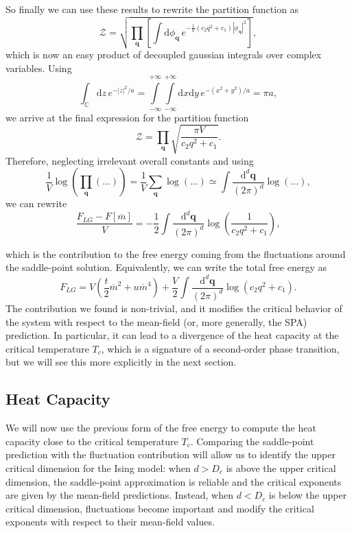 So finally we can use these results to rewrite the partition function as
\[
    \mathcal{Z} = \sqrt{\prod_{\mathbf{q}} \left[ \int \mathrm{d}\phi_{\mathbf{q}} \, e^{- \frac{1}{V} (c_2 q^2 + c_1) |\phi_{\mathbf{q}}|^2} \right]},
\]
which is now an easy product of decoupled gaussian integrals over complex variables. Using
\[
    \int_{\mathbb{C}} \mathrm{d}z \, e^{-|z|^2 / a} = \int\limits_{-\infty}^{+\infty} \int\limits_{-\infty}^{+\infty} \mathrm{d}x \mathrm{d}y \, e^{-(x^2 + y^2) / a} = \pi a,
\]
we arrive at the final expression for the partition function
\[
    \mathcal{Z} = \prod_{\mathbf{q}} \sqrt{\frac{\pi V}{c_2 q^2 + c_1}}.
\]
Therefore, neglecting irrelevant overall constants and using
\[
    \frac{1}{V} \log \left( \prod_{\mathbf{q}} (\dots) \right) = \frac{1}{V} \sum_{\mathbf{q}} \log(\dots) \simeq \int \frac{\mathrm{d}^d \mathbf{q}}{(2\pi)^d} \log(\dots),
\]
we can rewrite
\[
    \boxed{ \frac{F_{LG} - F[\overline{m}]}{V} = - \frac{1}{2} \int \frac{\mathrm{d}^d \mathbf{q}}{(2\pi)^d} \log \left( \frac{1}{c_2 q^2 + c_1} \right) },
\]

which is the contribution to the free energy coming from the fluctuations around the saddle-point solution. Equivalently, we can write the total free energy as
\[
    F_{LG} = V \left( \frac{t}{2}\overline{m}^2 + u\overline{m}^4 \right) + \frac{V}{2} \int \frac{\mathrm{d}^d \mathbf{q}}{(2\pi)^d} \log(c_2 q^2 + c_1).
\]
The contribution we found is non-trivial, and it modifies the critical behavior of the system with respect to the mean-field (or, more generally, the SPA) prediction. In particular, it can lead to a divergence of the heat capacity at the critical temperature \( T_c \), which is a signature of a second-order phase transition, but we will see this more explicitly in the next section.

\subsection{Heat Capacity}

We will now use the previous form of the free energy to compute the heat capacity close to the critical temperature \( T_c \). Comparing the saddle-point prediction with the fluctuation contribution will allow us to identify the upper critical dimension for the Ising model: when \( d > D_c \) is above the upper critical dimension, the saddle-point approximation is reliable and the critical exponents are given by the mean-field predictions. Instead, when \( d < D_c \) is below the upper critical dimension, fluctuations become important and modify the critical exponents with respect to their mean-field values.


